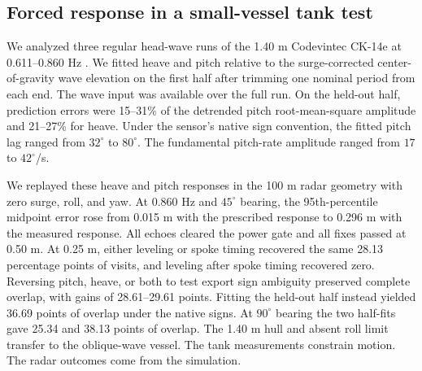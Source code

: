 \subsection{Forced response in a small-vessel tank test}

We analyzed three regular head-wave runs of the 1.40 m Codevintec CK-14e at 0.611--0.860 Hz \cite{Palma2025MooredASV,Palma2025CK14Data}. We fitted heave and pitch relative to the surge-corrected center-of-gravity wave elevation on the first half after trimming one nominal period from each end. The wave input was available over the full run. On the held-out half, prediction errors were 15--31\% of the detrended pitch root-mean-square amplitude and 21--27\% for heave. Under the sensor's native sign convention, the fitted pitch lag ranged from $32^\circ$ to $80^\circ$. The fundamental pitch-rate amplitude ranged from $17$ to $42^\circ$/s.

We replayed these heave and pitch responses in the 100 m radar geometry with zero surge, roll, and yaw. At 0.860 Hz and $45^\circ$ bearing, the 95th-percentile midpoint error rose from 0.015 m with the prescribed response to 0.296 m with the measured response. All echoes cleared the power gate and all fixes passed at 0.50 m. At 0.25 m, either leveling or spoke timing recovered the same 28.13 percentage points of visits, and leveling after spoke timing recovered zero. Reversing pitch, heave, or both to test export sign ambiguity preserved complete overlap, with gains of 28.61--29.61 points. Fitting the held-out half instead yielded 36.69 points of overlap under the native signs. At $90^\circ$ bearing the two half-fits gave 25.34 and 38.13 points of overlap. The 1.40 m hull and absent roll limit transfer to the oblique-wave vessel. The tank measurements constrain motion. The radar outcomes come from the simulation.
